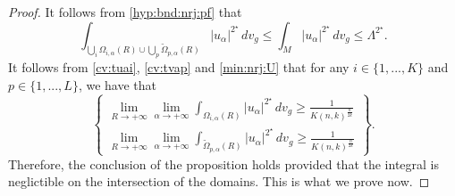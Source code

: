 \documentclass[10pt,a4paper]{amsart}
\def \crit {2^\star}
\def \ua {u_\alpha}
\begin{document}
\begin{proof} It follows from \eqref{hyp:bnd:nrj:pf} that
\begin{equation}\label{eq:36}
\int_{\bigcup_i\Omega_{i,\alpha}(R)\cup \bigcup_p\tilde{\Omega}_{p,\alpha}(R) }|\ua|^{\crit}\, dv_g\leq \int_M |\ua|^{\crit}\, dv_g\leq\Lambda^{\crit}.
\end{equation}
It follows from \eqref{cv:tuai}, \eqref{cv:tvap} and \eqref{min:nrj:U} that for any $i\in\{1,...,K\}$ and $p\in\{1,...,L\}$, we have that
\begin{equation}
\left\{\begin{array}{c}
\lim_{R\to +\infty}\lim_{\alpha\to +\infty}\int_{\Omega_{i,\alpha}(R) }|\ua|^{\crit}\, dv_g\geq \frac{1}{K(n,k)^{\frac{n}{2k}}}\\
\lim_{R\to +\infty}\lim_{\alpha\to +\infty}\int_{\tilde{\Omega}_{p,\alpha}(R)}|\ua|^{\crit}\, dv_g\geq \frac{1}{K(n,k)^{\frac{n}{2k}}}\end{array}\right\}.\label{eq:37}
\end{equation}
Therefore, the conclusion of the proposition holds provided  that the integral is neglictible on the intersection of the domains. This is what we prove now.


\end{proof}
\end{document}
